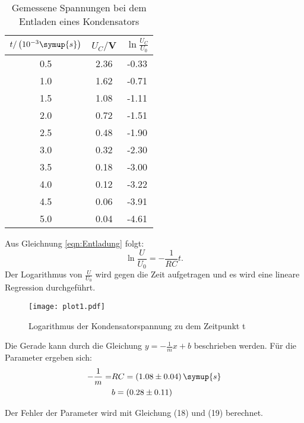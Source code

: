 \begin{table}[H]
  \centering
  \caption{Gemessene Spannungen bei dem Entladen eines Kondensators}
  \label{tab:Rechteckspannung}
  \begin{tabular}{c c c}
    \toprule
    $t/\left(10^{-3}\symup{s}\right)$ & $U_C/$V & $\ln{\frac{U_C}{U_0}}$ \\
    \midrule
    0.5 & 2.36 & -0.33 \\
    1.0 & 1.62 & -0.71 \\
    1.5 & 1.08 & -1.11 \\
    2.0 & 0.72 & -1.51 \\
    2.5 & 0.48 & -1.90 \\
    3.0 & 0.32 & -2.30 \\
    3.5 & 0.18 & -3.00 \\
    4.0 & 0.12 & -3.22 \\
    4.5 & 0.06 & -3.91 \\
    5.0 & 0.04 & -4.61 \\
    \bottomrule
  \end{tabular}
\end{table}

Aus Gleichnung \eqref{eqn:Entladung} folgt:
\begin{equation}
  \ln{\frac{U}{U_0}} = -\frac{1}{RC}t.
\end{equation}
Der Logarithmus von $\frac{U}{U_0}$ wird gegen die Zeit aufgetragen und es wird eine lineare Regression durchgeführt.



\begin{figure}[H]
  \centering
  \texttt{[image: plot1.pdf]}
  \caption{Logarithmus der Kondensatorspannung zu dem Zeitpunkt t}
  \label{fig:entladung}
\end{figure}

Die Gerade kann durch die Gleichung $y = -\frac{1}{m}x + b$ beschrieben werden. Für die Parameter ergeben sich:
\begin{align*}
  -\frac{1}{m} = &RC = (1.08 \pm 0.04) \, \symup{s} \\
  &b = (0.28 \pm 0.11)
\end{align*}

Der Fehler der Parameter wird mit Gleichung (18) und (19) berechnet.
